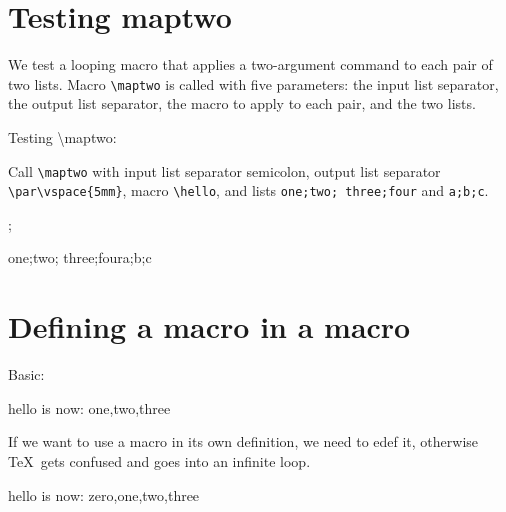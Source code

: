 \documentclass[12pt,\documentclassflag]{lawbrief}
\begin{document}
\section{Testing maptwo}

We test a looping macro that applies a two-argument command to each
pair of two lists. Macro \lstinline|\maptwo| is called with five
parameters: the input list separator, the output list separator, the
macro to apply to each pair, and the two lists.

\begin{LTXexample}
  \long{}
  \def\hello#1#2{hello #1 #2}

  Testing \textbackslash{}maptwo:

  Call \lstinline|\maptwo| with input list separator semicolon,
  output list separator \lstinline|\par\vspace{5mm}|, macro \lstinline|\hello|, and lists
  \lstinline|one;two; three;four| and \lstinline|a;b;c|.
  
  \maptwo;{\par\vspace{5mm}}{\hello}{one;two; three;four}{a;b;c}
  
\end{LTXexample}

\section{Defining a macro in a macro}

Basic: 

\begin{LTXexample}
  \def\mklst#1{\def#1{one,two,three}}
  \mklst{\hello}
  hello is now: 
  \hello 
\end{LTXexample}

If we want to use a macro in its own definition, we need to edef it,  
otherwise \TeX\ gets confused and goes into an infinite loop.  

 \begin{LTXexample}
  \def\mklst#1{\edef#1{#1,one,two,three}}
  \def\hello{zero}
  \mklst{\hello}
  hello is now:   \hello 
\end{LTXexample}
\end{document}
